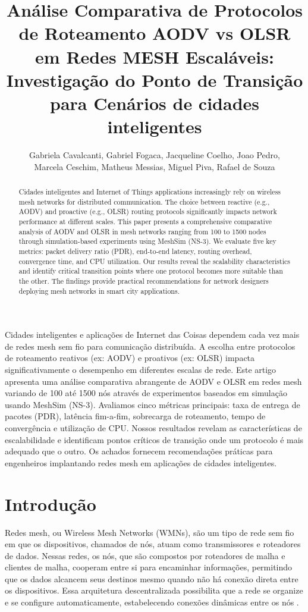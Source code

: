 \documentclass[12pt]{article}
\title{Análise Comparativa de Protocolos de Roteamento AODV vs OLSR em Redes MESH Escaláveis: Investigação do Ponto de Transição para Cenários de cidades inteligentes}
\author{Gabriela Cavalcanti\inst{1}, Gabriel Fogaca\inst{1}, Jacqueline Coelho\inst{1}, Joao Pedro\inst{1},\\ Marcela Ceschim\inst{1}, Matheus Messias\inst{1}, Miguel Piva\inst{1}, Rafael de Souza\inst{1}}
\begin{document}
\maketitle

\begin{abstract}
  Cidades inteligentes and Internet of Things applications increasingly rely on wireless mesh networks for distributed communication. The choice between reactive (e.g., AODV) and proactive (e.g., OLSR) routing protocols significantly impacts network performance at different scales. This paper presents a comprehensive comparative analysis of AODV and OLSR in mesh networks ranging from 100 to 1500 nodes through simulation-based experiments using MeshSim (NS-3). We evaluate five key metrics: packet delivery ratio (PDR), end-to-end latency, routing overhead, convergence time, and CPU utilization. Our results reveal the scalability characteristics and identify critical transition points where one protocol becomes more suitable than the other. The findings provide practical recommendations for network designers deploying mesh networks in smart city applications.
\end{abstract}

\begin{resumo}
  Cidades inteligentes e aplicações de Internet das Coisas dependem cada vez mais de redes mesh sem fio para comunicação distribuída. A escolha entre protocolos de roteamento reativos (ex: AODV) e proativos (ex: OLSR) impacta significativamente o desempenho em diferentes escalas de rede. Este artigo apresenta uma análise comparativa abrangente de AODV e OLSR em redes mesh variando de 100 até 1500 nós através de experimentos baseados em simulação usando MeshSim (NS-3). Avaliamos cinco métricas principais: taxa de entrega de pacotes (PDR), latência fim-a-fim, sobrecarga de roteamento, tempo de convergência e utilização de CPU. Nossos resultados revelam as características de escalabilidade e identificam pontos críticos de transição onde um protocolo é mais adequado que o outro. Os achados fornecem recomendações práticas para engenheiros implantando redes mesh em aplicações de cidades inteligentes.
\end{resumo}

\section{Introdução}

Redes mesh, ou Wireless Mesh Networks (WMNs), são um tipo de rede sem fio em que os dispositivos, chamados de nós, atuam como transmissores e roteadores de dados. Nessas redes, os nós, que são compostos por roteadores de malha e clientes de malha, cooperam entre si para encaminhar informações, permitindo que os dados alcancem seus destinos mesmo quando não há conexão direta entre os dispositivos. Essa arquitetura descentralizada possibilita que a rede se organize e se configure automaticamente, estabelecendo conexões dinâmicas entre os nós \cite{mesh_passos_2005}. 
\end{document}
